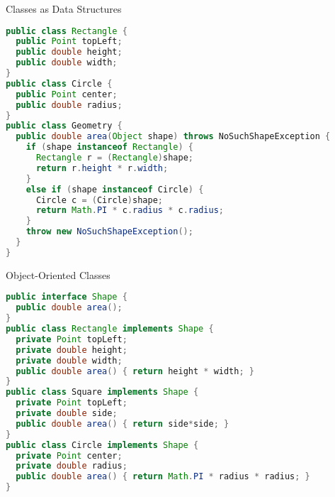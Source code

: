 \documentclass{beamer}
\begin{document}
\begin{frame}[fragile]{Classes as Data Structures}
\vspace{-.1in}
\begin{lstlisting}[language=Java]
public class Rectangle {
  public Point topLeft;
  public double height;
  public double width;
}
public class Circle {
  public Point center;
  public double radius;
}
public class Geometry {
  public double area(Object shape) throws NoSuchShapeException {
    if (shape instanceof Rectangle) {
      Rectangle r = (Rectangle)shape;
      return r.height * r.width;
    }
    else if (shape instanceof Circle) {
      Circle c = (Circle)shape;
      return Math.PI * c.radius * c.radius;
    }
    throw new NoSuchShapeException();
  }
}
\end{lstlisting}


\end{frame}

\begin{frame}[fragile]{Object-Oriented Classes}


\begin{lstlisting}[language=Java]
public interface Shape {
  public double area();
}
public class Rectangle implements Shape {
  private Point topLeft;
  private double height;
  private double width;
  public double area() { return height * width; }
}
public class Square implements Shape {
  private Point topLeft;
  private double side;
  public double area() { return side*side; }
}
public class Circle implements Shape {
  private Point center;
  private double radius;
  public double area() { return Math.PI * radius * radius; }
}
\end{lstlisting}

\end{frame}
\end{document}
